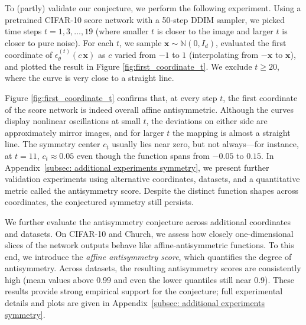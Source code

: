 \documentclass[12pt]{article}
\newcommand{\x}{\mathbf{x}}
\newcommand{\0}{\mathbf{0}}
\newcommand{\bN}{\mathbb{N}}
\begin{document}
To (partly) validate our conjecture, we perform the following experiment. Using a pretrained CIFAR-10 score network with a 50-step DDIM sampler, we picked time steps $t=1,3,\dots,19$ (where smaller $t$ is closer to the image and larger $t$ is closer to pure noise). For each $t$, we sample $\x\sim\bN(0,I_d)$, evaluated the first coordinate of $\epsilon_\theta^{(t)}(c\,\x)$ as $c$ varied from $-1$ to $1$ (interpolating from $-\mathbf{x}$ to $\mathbf{x}$), and plotted the result in Figure \ref{fig:first_coordinate_t}. We exclude $t \ge 20$, where the curve is very close to a straight line.




Figure \ref{fig:first_coordinate_t} confirms that, at every  step $t$, the first coordinate of the score network is indeed overall affine antisymmetric. Although the curves display nonlinear oscillations at small $t$, the deviations on either side are approximately mirror images, and for larger $t$ the mapping is almost a straight line. The symmetry center $c_t$ usually lies near zero, but not always—for instance, at $t = 11$, $c_t\approx 0.05$ even though the function spans from $-0.05$ to $0.15$. In Appendix~\ref{subsec: additional experiments symmetry}, we present further validation experiments using alternative coordinates, datasets, and a quantitative metric called the antisymmetry score. Despite the distinct function shapes across coordinates, the conjectured symmetry still persists.



We further evaluate the antisymmetry conjecture across additional coordinates and datasets. On CIFAR-10 and Church, we assess how closely one-dimensional slices of the network outputs behave like affine-antisymmetric functions. To this end, we introduce the \emph{affine antisymmetry score}, which quantifies the degree of antisymmetry. Across datasets, the resulting antisymmetry scores are consistently high (mean values above 0.99 and even the lower quantiles still near 0.9). These results provide strong empirical support for the conjecture; full experimental details and plots are given in Appendix~\ref{subsec: additional experiments symmetry}.
\end{document}
